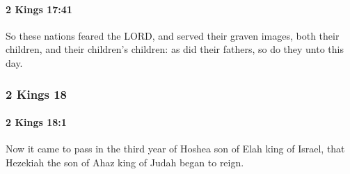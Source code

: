 		\paragraph{2 Kings 17:41} %
			\label{2KINGS-17-41}

			So these nations feared the LORD, and served their graven images, both their children, and their children’s children: as did their fathers, so do they unto this day.

	\subsubsection{2 Kings 18} %
		\label{2KINGS-18}

		\paragraph{2 Kings 18:1} %
			\label{2KINGS-18-1}

			Now it came to pass in the third year of Hoshea son of Elah king of Israel, that Hezekiah the son of Ahaz king of Judah began to reign.

